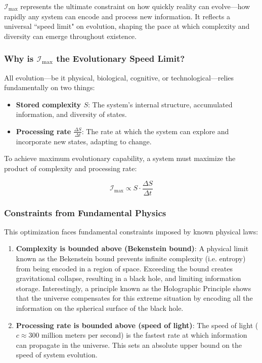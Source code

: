\documentclass[12pt]{article}
\begin{document}
\(\mathcal{I}_{\text{max}}\) represents the ultimate constraint on how quickly reality can evolve—how rapidly any system can encode and process new information. It reflects a universal ``speed limit" on evolution, shaping the pace at which complexity and diversity can emerge throughout existence.

\subsubsection{Why is \(\mathcal{I}_{\text{max}}\) the Evolutionary Speed Limit?}

All evolution—be it physical, biological, cognitive, or technological—relies fundamentally on two things:

\begin{itemize}
    \item \textbf{Stored complexity \( S \)}: The system’s internal structure, accumulated information, and diversity of states.
    \item \textbf{Processing rate \( \frac{\Delta S}{\Delta t} \)}: The rate at which the system can explore and incorporate new states, adapting to change.
\end{itemize}

To achieve maximum evolutionary capability, a system must maximize the product of complexity and processing rate:

\begin{equation}
\mathcal{I}_{\text{max}} \propto S \cdot \frac{\Delta S}{\Delta t}
\end{equation}

\subsubsection{Constraints from Fundamental Physics}

This optimization faces fundamental constraints imposed by known physical laws:

\begin{enumerate}
    \item \textbf{Complexity is bounded above (Bekenstein bound)}:  
    A physical limit known as the Bekenstein bound prevents infinite complexity (i.e. entropy) from being encoded in a region of space. Exceeding the bound creates gravitational collapse, resulting in a black hole, and limiting information storage. Interestingly, a principle known as the Holographic Principle shows that the universe compensates for this extreme situation by encoding all the information on the spherical surface of the black hole.
    \item \textbf{Processing rate is bounded above (speed of light)}:
     The speed of light ($c \approx 300$  million meters per second) is the fastest rate at which information can propagate in the universe. This sets an absolute upper bound on the speed of system evolution.
\end{enumerate}
\end{document}
